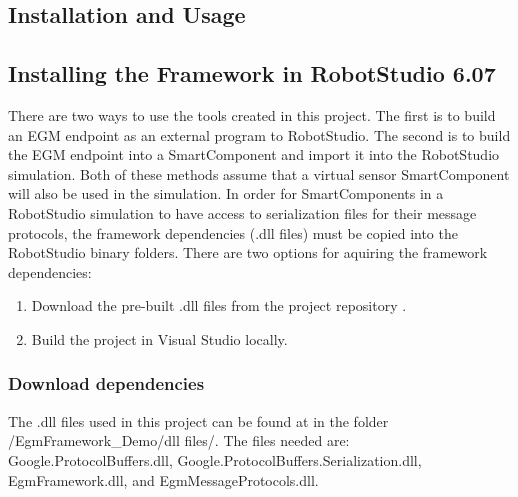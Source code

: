 \documentclass{cslthse-msc}
\begin{document}
\begin{appendices}


\chapter{Installation and Usage}
\label{app:Install_Use}

\section{Installing the Framework in RobotStudio 6.07}
\label{app:Install_Use:RobotStudio}
There are two ways to use the tools created in this project. The first is to build an EGM endpoint as an external program to RobotStudio. The second is to build the EGM endpoint into a SmartComponent and import it into the RobotStudio simulation. Both of these methods assume that a virtual sensor SmartComponent will also be used in the simulation. In order for SmartComponents in a RobotStudio simulation to have access to serialization files for their message protocols, the framework dependencies (.dll files) must be copied into the RobotStudio binary folders. There are two options for aquiring the framework dependencies:
\begin{enumerate}
    \item Download the pre-built .dll files from the project repository \cite[]{Greg:LthRobotStudio}.
    \item Build the project in Visual Studio locally.
\end{enumerate}

\subsection{Download dependencies}
\label{app:Install_Use:RobotStudio:download}
The .dll files used in this project can be found at \cite{Greg:Ref_Repo} in the folder /EgmFramework\_Demo/dll files/. The files needed are: Google.ProtocolBuffers.dll, Google.ProtocolBuffers.Serialization.dll, EgmFramework.dll, and EgmMessageProtocols.dll. 


\end{appendices}
\end{document}
